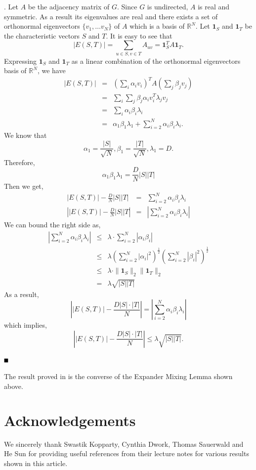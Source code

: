 \documentclass{article}
\newcommand{\bproof}{\noindent{\bf Proof}}
\newcommand{\eproof}{\hspace*{\fill}$\rule{2mm}{2mm}$~~~~\bigskip}
\renewenvironment{proof}{\bproof. }{\eproof}
\newcommand{\R}{\mathbb{R}}
\begin{document}
\begin{proof}
Let $A$ be the adjacency matrix of $G$. Since $G$ is undirected, $A$ is real and symmetric. As a result its eigenvalues are real and there exists a set of orthonormal eigenvectors $\{v_1,\ldots v_N\}$ of $A$ which is a basis of $\R ^N$. Let $\mathbf{1}_S$ and $\mathbf{1}_T$ be the characteristic vectors $S$ and $T$. It is easy to see that
\[
|E(S,T)|=\sum_{u\in S,v\in T}A_{uv}=\mathbf{1}_S^TA\mathbf{1}_T.
\]
Expressing $\mathbf{1}_S$ and $\mathbf{1}_T$ as a linear combination of the orthonormal eigenvectors basis of $\R ^N$, we have
\begin{eqnarray*}
|E(S,T)|&=&(\sum_i\alpha_iv_i)^TA(\sum_j\beta_jv_j)\\
&=&\sum_i\sum_j\beta_j\alpha_iv_i^T\lambda_jv_j\\
&=&\sum_i\alpha_i\beta_i\lambda_i\\
&=&\alpha_1\beta_1\lambda_1+\sum_{i=2}^N\alpha_i\beta_i\lambda_i.
\end{eqnarray*}
We know that
\[
\alpha_1=\frac{|S|}{\sqrt{N}}, \beta_1=\frac{|T|}{\sqrt{N}}, \lambda_1=D.
\]
Therefore,
\[
\alpha_1\beta_1\lambda_1=\frac{D}{N}|S||T|
\]
Then we get,
\begin{eqnarray*}
|E(S,T)|-\frac{D}{N}|S||T|&=&\sum_{i=2}^N\alpha_i\beta_i\lambda_i\\
\left||E(S,T)|-\frac{D}{N}|S||T\right|&=&\left|\sum_{i=2}^N\alpha_i\beta_i\lambda_i\right|
\end{eqnarray*}
We can bound the right side as,
\begin{eqnarray*}
\left|\sum_{i=2}^N\alpha_i\beta_i\lambda_i\right|&\leq&\lambda\cdot\sum_{i=2}^N|\alpha_i\beta_i|\\
&\leq&\lambda\left(\sum_{i=2}^{N}|\alpha_i|^2\right)^{\frac{1}{2}}\left(\sum_{i=2}^{N}|\beta_i|^2\right)^{\frac{1}{2}}\\
&\leq&\lambda\cdot\|\mathbf{1}_S\|_2\|\mathbf{1}_T\|_2\\
&=&\lambda\sqrt{|S||T|}
\end{eqnarray*}
As a result,
\[
\left ||E(S,T)|-\frac{D|S|\cdot |T|}{N}\right |=\left|\sum_{i=2}^N\alpha_i\beta_i\lambda_i\right|
\]
which implies,
\[
\left ||E(S,T)|-\frac{D|S|\cdot |T|}{N}\right |\leq\lambda\sqrt{|S||T|}.
\]

\end{proof}

The result proved in \cite[Lemma 3.3 \& Corollary 5.1]{BL2006} is the converse of the Expander Mixing Lemma shown above.

\section*{Acknowledgements}
We sincerely thank Swastik Kopparty, Cynthia Dwork, Thomas Sauerwald and He Sun for providing useful references from their lecture notes for various results shown in this article.
\end{document}
